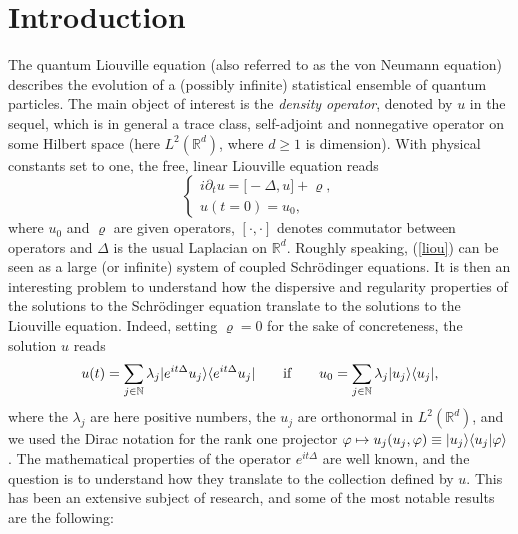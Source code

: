 \documentclass[12pt]{article}
\def \Rm {\mathbb R}
\def \Nm {\mathbb N}
\def\fref#1{{\rm (\ref{#1})}}
\newcommand{\be}{\begin{equation}}
\newcommand{\ee}{\end{equation}}
\DeclarePairedDelimiter\bra{\langle}{\rvert}
\DeclarePairedDelimiter\ket{\lvert}{\rangle}
\begin{document}
\section{Introduction}
The quantum Liouville equation (also referred to as the von Neumann equation) describes the evolution of a (possibly infinite) statistical ensemble of quantum particles. The main object of interest is the \textit{density operator}, denoted by $u$ in the sequel, which is in general a trace class, self-adjoint and nonnegative operator on some Hilbert space (here $L^2(\Rm^d)$, where $d\geq 1$ is dimension). With physical constants set to one, the free, linear Liouville equation reads
\be \label{liou}
\left\{
\begin{array}{l}
i \partial_t u=\big[-\Delta,u \big]+\varrho,\\
u(t=0)=u_0,
\end{array}
\right.
\ee
where $u_0$ and $\varrho$ are given operators, $[\cdot, \cdot]$ denotes commutator between operators and $\Delta$ is the usual Laplacian on $\Rm^d$. Roughly speaking, \fref{liou} can be seen as a large (or infinite) system of coupled Schr\"odinger equations. It is then an interesting problem to understand how the dispersive and regularity properties of the solutions to the Schr\"odinger equation translate to the solutions to the Liouville equation. Indeed, setting $\varrho=0$ for the sake of concreteness, the solution $u$ reads
$$
u(t)=\sum_{j \in \Nm} \lambda_j \ket{e^{i t\Delta}u_j} \bra{e^{it \Delta} u_j} \qquad \textrm{if} \qquad u_0 =\sum_{j \in \Nm} \lambda_j \ket{u_j} \bra{u_j},
$$
where the $\lambda_j$ are here positive numbers, the $u_j$ are orthonormal in $L^2(\Rm^d)$, and we used the Dirac notation for the rank one projector $\varphi \mapsto u_j (u_j,\varphi) \equiv \ket{u_j} \langle u_j \vert\varphi \rangle$. The mathematical properties of the operator $e^{it \Delta}$ are well known, and the question is to understand how they translate to the collection defined by $u$. This has been an extensive subject of research, and some of the most notable results are the following: 
\end{document}
